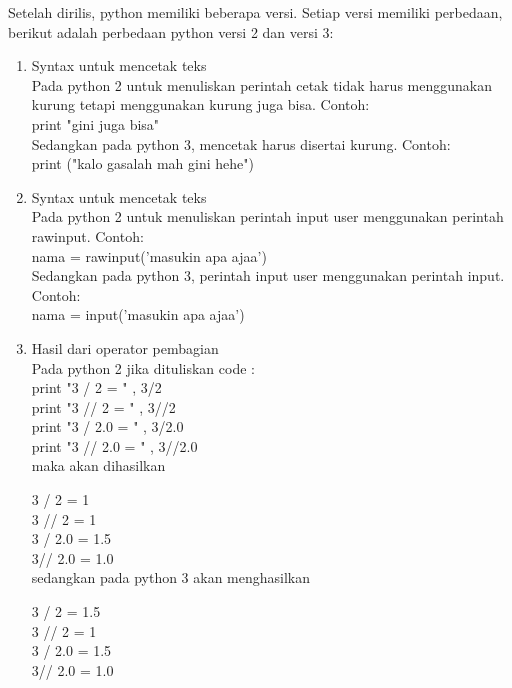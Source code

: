 Setelah dirilis, python memiliki beberapa versi. Setiap versi memiliki perbedaan, berikut adalah perbedaan python versi 2 dan versi 3:
\begin{enumerate}[label=\alph*.]

\item Syntax untuk mencetak teks\\
Pada python 2 untuk menuliskan perintah cetak tidak harus menggunakan kurung tetapi menggunakan kurung juga bisa. Contoh:\\
print "gini juga bisa"\\
Sedangkan pada python 3, mencetak harus disertai kurung.  Contoh:\\
print ("kalo gasalah mah gini hehe")

\item Syntax untuk mencetak teks\\
Pada python 2 untuk menuliskan perintah input user menggunakan perintah raw\textunderscore input. Contoh:\\
nama = raw\textunderscore input('masukin apa ajaa')\\
Sedangkan pada python 3,  perintah input user menggunakan perintah input.  Contoh:\\
nama = input('masukin apa ajaa')\\

\item Hasil dari operator pembagian\\
Pada python 2 jika dituliskan code :\\
print "3 / 2 = " , 3/2\\
print "3 // 2 = " , 3//2\\
print "3 / 2.0 = " , 3/2.0\\
print "3 // 2.0 = " , 3//2.0\\

maka akan dihasilkan 

3 / 2 = 1\\
3 // 2 = 1\\
3 / 2.0 = 1.5\\
3// 2.0 = 1.0\\

sedangkan pada python 3 akan menghasilkan 

3 / 2 = 1.5\\
3 // 2 = 1\\
3 / 2.0 = 1.5\\
3// 2.0 = 1.0\\

\end{enumerate}

